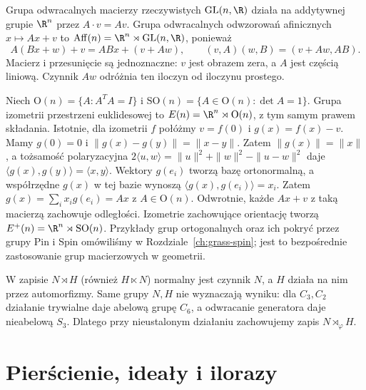 \begin{przyklad}
Grupa odwracalnych macierzy rzeczywistych $\mathrm{GL}(n,\R)$
działa na addytywnej grupie $\R^n$ przez $A\cdot v=Av$.
Grupa odwracalnych odwzorowań afinicznych $x\mapsto Ax+v$ to
$\operatorname{Aff}(n)=\R^n\rtimes\mathrm{GL}(n,\R)$, ponieważ
\[
 A(Bx+w)+v=ABx+(v+Aw),\qquad
 (v,A)(w,B)=(v+Aw,AB).
\]
Macierz i przesunięcie są jednoznaczne: $v$ jest obrazem zera,
a $A$ jest częścią liniową. Czynnik $Aw$ odróżnia ten iloczyn
od iloczynu prostego.
\end{przyklad}

\begin{przyklad}
Niech $\mathrm O(n)=\{A:A^TA=I\}$ i
$\mathrm{SO}(n)=\{A\in\mathrm O(n):\det A=1\}$.
Grupa izometrii przestrzeni euklidesowej to
$E(n)=\R^n\rtimes\mathrm O(n)$, z tym samym prawem składania.
Istotnie, dla izometrii $f$ połóżmy $v=f(0)$ i $g(x)=f(x)-v$.
Mamy $g(0)=0$ i $\|g(x)-g(y)\|=\|x-y\|$. Zatem
$\|g(x)\|=\|x\|$, a tożsamość polaryzacyjna
$2\langle u,w\rangle=\|u\|^2+\|w\|^2-\|u-w\|^2$ daje
$\langle g(x),g(y)\rangle=\langle x,y\rangle$.
Wektory $g(e_i)$ tworzą bazę ortonormalną, a współrzędne $g(x)$
w tej bazie wynoszą $\langle g(x),g(e_i)\rangle=x_i$.
Zatem $g(x)=\sum_i x_i g(e_i)=Ax$ z $A\in\mathrm O(n)$.
Odwrotnie, każde $Ax+v$ z taką macierzą zachowuje odległości.
Izometrie zachowujące orientację tworzą
$E^+(n)=\R^n\rtimes\mathrm{SO}(n)$.
Przykłady grup ortogonalnych oraz ich pokryć
przez grupy Pin i Spin omówiliśmy w
Rozdziale~\ref{ch:grass-spin}; jest to bezpośrednie
zastosowanie grup macierzowych w geometrii.
\end{przyklad}

\begin{uwaga}
W zapisie $N\rtimes H$ (również $H\ltimes N$) normalny jest czynnik
$N$, a $H$ działa na nim przez automorfizmy. Same grupy $N,H$ nie
wyznaczają wyniku: dla $C_3,C_2$ działanie trywialne daje abelową
grupę $C_6$, a odwracanie generatora daje nieabelową $S_3$.
Dlatego przy nieustalonym działaniu zachowujemy zapis $N\rtimes_\varphi H$.
\end{uwaga}


\section{Pierścienie, ideały i ilorazy}
\label{sec:pierscienie-idealy}

